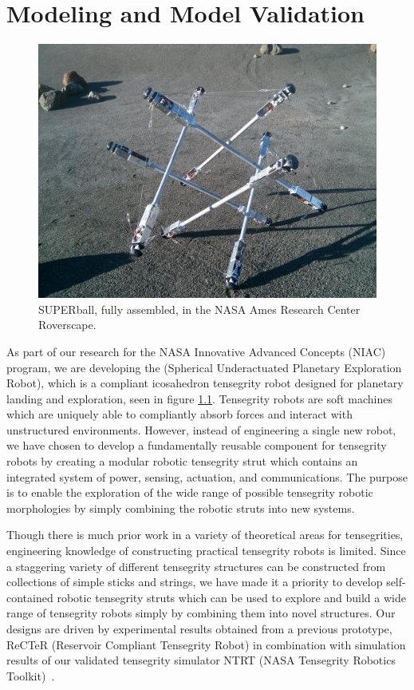 \chapter{Modeling and Model Validation}
\label{modeling}

\begin{figure}[thpb]
      \centering
      \includegraphics[width=0.8\columnwidth]{tex/img/superball_roverscape2_cropped.jpg}
      \caption{SUPERball, fully assembled, in the NASA Ames Research Center Roverscape.}
      \label{fig:SB}
\end{figure}

As part of our research for the NASA Innovative Advanced
Concepts  (NIAC)  program,  we  are  developing  the \SB{} (Spherical Underactuated Planetary Exploration Robot),
which is a compliant icosahedron tensegrity robot designed
for   planetary   landing   and   exploration, seen in figure \ref{fig:SB}.   Tensegrity   robots
are  soft  machines  which  are  uniquely  able  to  compliantly
absorb  forces  and  interact  with  unstructured  environments.
However, instead of engineering a single new robot, we have
chosen  to  develop  a  fundamentally  reusable  component  for
tensegrity  robots  by  creating  a  modular  robotic  tensegrity
strut which contains an integrated system of power, sensing,
actuation, and communications. The purpose is to enable the
exploration of the wide range of possible tensegrity robotic
morphologies  by  simply  combining  the  robotic  struts  into
new systems.

Though there is much prior work in a variety of theoretical
areas for tensegrities, engineering knowledge of constructing
practical  tensegrity  robots  is  limited.  Since  a  staggering
variety  of  different  tensegrity  structures  can  be  constructed
from  collections  of  simple  sticks  and  strings, we have made it a priority
to develop self-contained robotic tensegrity struts which can
be  used  to  explore  and  build  a  wide  range  of  tensegrity
robots  simply  by  combining  them  into  novel  structures.
Our  designs  are  driven  by  experimental  results  obtained
from  a  previous  prototype,  ReCTeR  (Reservoir  Compliant
Tensegrity Robot) in combination with simulation results of
our validated tensegrity simulator NTRT (NASA Tensegrity
Robotics Toolkit)~\cite{2917079}\cite{Caluwaerts2013rsif}.

